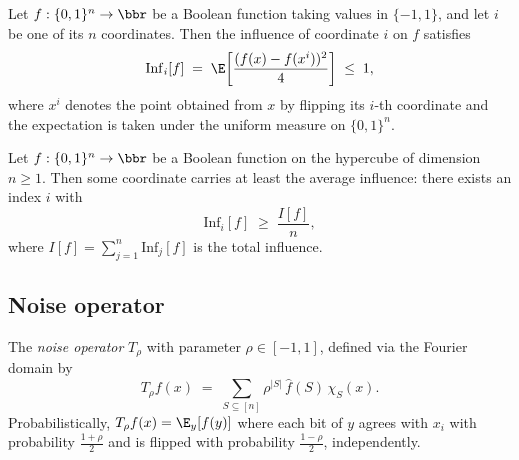 \begin{lemma}
\label{BooleanAnalysis.influence_le_one}
\leanok
{}
Let $f : \{0,1\}^n \to \bbr$ be a Boolean function taking values in $\{-1, 1\}$, and let
$i$ be one of its $n$ coordinates. Then the influence of coordinate $i$ on $f$ satisfies
\[
  \mathrm{Inf}_i[f] \;=\; \E\!\left[\frac{(f(x)-f(x^i))^2}{4}\right] \;\le\; 1,
\]
where $x^i$ denotes the point obtained from $x$ by flipping its $i$-th coordinate and
the expectation is taken under the uniform measure on $\{0,1\}^n$.
\end{lemma}

\begin{lemma}
\label{BooleanAnalysis.max_influence_lower_bound}
\leanok
{}
Let $f:\{0,1\}^n\to\bbr$ be a Boolean function on the hypercube of dimension $n\ge 1$.
Then some coordinate carries at least the average influence: there exists an index $i$
with
\[
  \mathrm{Inf}_i[f] \;\ge\; \frac{I[f]}{n},
\]
where $I[f]=\sum_{j=1}^{n}\mathrm{Inf}_j[f]$ is the total influence.
\end{lemma}

\subsection{Noise operator}

\begin{definition}
\label{BooleanAnalysis.noiseOp}
\leanok
{}
The \emph{noise operator} $T_\rho$ with parameter $\rho\in[-1,1]$, defined via
the Fourier domain by
\[
  T_\rho f(x) \;=\; \sum_{S\subseteq[n]} \rho^{|S|}\,\hat f(S)\,\chi_S(x).
\]
Probabilistically, $T_\rho f(x) = \E_y[f(y)]$ where each bit of $y$ agrees
with $x_i$ with probability $\tfrac{1+\rho}{2}$ and is flipped with probability
$\tfrac{1-\rho}{2}$, independently.
\end{definition}

